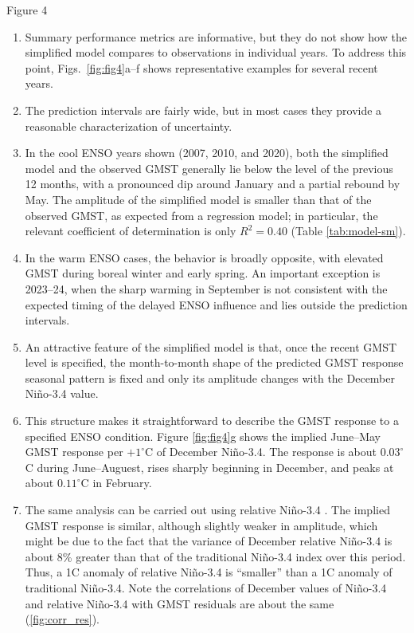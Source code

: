 \documentclass[aspectratio=169,xcolor=dvipsnames]{beamer}
\begin{document}
\begin{frame}{Figure 4}  
  \begin{enumerate}\tiny
  \item Summary performance metrics are informative, but they do not
    show how the simplified model compares to observations in
    individual years.  To address this point, Figs.\
    \ref{fig:fig4}a--f shows representative examples for several
    recent years.

\item The prediction intervals are fairly wide, but in most cases
  they provide a reasonable characterization of uncertainty.

\item In the cool ENSO years shown (2007, 2010, and 2020), both
  the simplified model and the observed GMST generally lie below
  the level of the previous 12 months, with a pronounced dip
  around January and a partial rebound by May. The amplitude of
  the simplified model is smaller than that of the observed GMST,
  as expected from a regression model; in particular, the
  relevant coefficient of determination is only $R^2=0.40$
  (Table \ref{tab:model-sm}).

\item In the warm ENSO cases, the behavior is broadly opposite,
  with elevated GMST during boreal winter and early spring.
  An important exception is 2023--24, when the sharp warming in
  September is not consistent with the expected timing of the
  delayed ENSO influence and lies outside the prediction
  intervals.

\item An attractive feature of the simplified model is that, once the
  recent GMST level is specified, the month-to-month shape of the
  predicted GMST response seasonal pattern is fixed and only its
  amplitude changes with the December Ni\~no-3.4 value.

\item This structure makes it straightforward to describe the GMST
  response to a specified ENSO condition. Figure \ref{fig:fig4}g shows
  the implied June--May GMST response per $+1^\circ$C of December
  Ni\~no-3.4. The response is about $0.03^\circ$C during
  June--Auguest, rises sharply beginning in December, and peaks at
  about $0.11^\circ$C in February.

\item The same analysis can be carried out using relative Ni\~no-3.4
  \citep{LHeureux2024relative}. The implied GMST response is similar,
  although slightly weaker in amplitude, which might be due to the
  fact that the variance of December relative Ni\~no-3.4 is about 8\%
  greater than that of the traditional Ni\~no-3.4 index over this
  period. Thus, a 1\textdegree C anomaly of relative Ni\~no-3.4 is
  ``smaller'' than a 1\textdegree C anomaly of traditional
  Ni\~no-3.4. Note the correlations of December values of Ni\~no-3.4
  and relative Ni\~no-3.4 with GMST residuals are about the same
  (\ref{fig:corr_res}).
  

\end{enumerate}
\end{frame}
\end{document}
